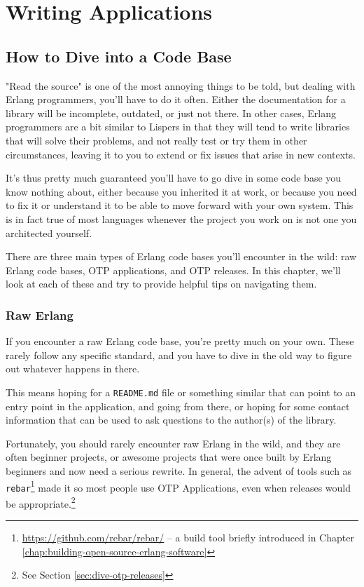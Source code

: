 \documentclass[11pt, oneside]{book}   	%
\newcommand{\filename}[1]{\Verb`#1`}
\newcommand{\app}[1]{\Verb`#1`}
\begin{document}

\part{Writing Applications}
\label{part:writing-applications}

\chapter{How to Dive into a Code Base}
\label{chap:how-to-dive-into-a-code-base}

"Read the source" is one of the most annoying things to be told, but dealing with Erlang programmers, you'll have to do it often. Either the documentation for a library will be incomplete, outdated, or just not there. In other cases, Erlang programmers are a bit similar to Lispers in that they will tend to write libraries that will solve their problems, and not really test or try them in other circumstances, leaving it to you to extend or fix issues that arise in new contexts.

It's thus pretty much guaranteed you'll have to go dive in some code base you know nothing about, either because you inherited it at work, or because you need to fix it or understand it to be able to move forward with your own system. This is in fact true of most languages whenever the project you work on is not one you architected yourself.

There are three main types of Erlang code bases you'll encounter in the wild: raw Erlang code bases, OTP applications, and OTP releases. In this chapter, we'll look at each of these and try to provide helpful tips on navigating them.

\section{Raw Erlang}
\label{sec:dive-raw-erlang}

If you encounter a raw Erlang code base, you're pretty much on your own. These rarely follow any specific standard, and you have to dive in the old way to figure out whatever happens in there.

This means hoping for a \filename{README.md} file or something similar that can point to an entry point in the application, and going from there, or hoping for some contact information that can be used to ask questions to the author(s) of the library.

Fortunately, you should rarely encounter raw Erlang in the wild, and they are often beginner projects, or awesome projects that were once built by Erlang beginners and now need a serious rewrite. In general, the advent of tools such as \app{rebar}\footnote{\href{https://github.com/rebar/rebar/}{https://github.com/rebar/rebar/} -- a build tool briefly introduced in Chapter \ref{chap:building-open-source-erlang-software}} made it so most people use OTP Applications, even when releases would be appropriate.\footnote{See Section \ref{sec:dive-otp-releases}}
\end{document}
